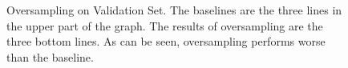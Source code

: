 \begin{figure}[!ht]
    \centering
    \par\medskip
    \centering
    \par\medskip
  \caption{Oversampling on Validation Set. The baselines are the three lines in the upper part of the graph. The results of oversampling are the three bottom lines. As can be seen, oversampling performs worse than the baseline.}
  \label{fig:over_val}
\end{figure}

